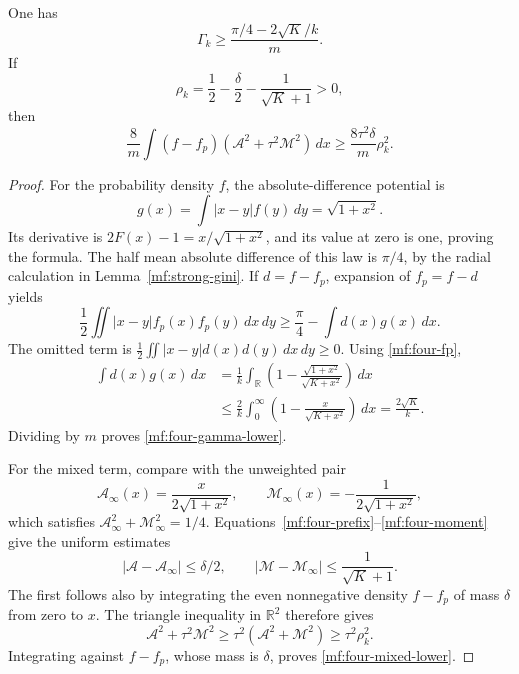 \begin{lemma}\label{mf:four-bounds}
One has
\begin{equation}\label{mf:four-gamma-lower}
 \Gamma_k\ge
 \frac{\pi/4-2\sqrt K/k}{m}.
\end{equation}
If
\[
 \rho_k=\frac12-\frac\delta2-\frac1{\sqrt K+1}>0,
\]
then
\begin{equation}\label{mf:four-mixed-lower}
 \frac8m\int(f-f_p)(\mathcal A^2+\tau^2\mathcal M^2)\,dx
 \ge\frac{8\tau^2\delta}{m}\rho_k^2.
\end{equation}
\end{lemma}
\begin{proof}
For the probability density \(f\), the absolute-difference potential is
\[
 g(x)=\int|x-y|f(y)\,dy=\sqrt{1+x^2}.
\]
Its derivative is \(2F(x)-1=x/\sqrt{1+x^2}\), and its value at zero
is one, proving the formula. The half mean absolute difference of this
law is \(\pi/4\), by the radial calculation in
Lemma~\ref{mf:strong-gini}.
If \(d=f-f_p\), expansion of \(f_p=f-d\) yields
\[
 \frac12\iint|x-y|f_p(x)f_p(y)\,dx\,dy
 \ge\frac\pi4-\int d(x)g(x)\,dx.
\]
The omitted term is
\(\tfrac12\iint|x-y|d(x)d(y)\,dx\,dy\ge0\).
Using \eqref{mf:four-fp},
\begin{align*}
 \int d(x)g(x)\,dx
 &=\frac1k\int_{\mathbb R}
       \left(1-\frac{\sqrt{1+x^2}}{\sqrt{K+x^2}}\right)\,dx\\
 &\le\frac2k\int_0^\infty
       \left(1-\frac{x}{\sqrt{K+x^2}}\right)\,dx
 =\frac{2\sqrt K}{k}.
\end{align*}
Dividing by \(m\) proves \eqref{mf:four-gamma-lower}.

For the mixed term, compare with the unweighted pair
\[
 \mathcal A_\infty(x)=\frac{x}{2\sqrt{1+x^2}},\qquad
 \mathcal M_\infty(x)=-\frac1{2\sqrt{1+x^2}},
\]
which satisfies \(\mathcal A_\infty^2+\mathcal M_\infty^2=1/4\).
Equations~\eqref{mf:four-prefix}--\eqref{mf:four-moment} give the
uniform estimates
\[
 |\mathcal A-\mathcal A_\infty|\le\delta/2,\qquad
 |\mathcal M-\mathcal M_\infty|\le\frac1{\sqrt K+1}.
\]
The first follows also by integrating the even nonnegative density
\(f-f_p\) of mass \(\delta\) from zero to \(x\).
The triangle inequality in \(\mathbb R^2\) therefore gives
\[
 \mathcal A^2+\tau^2\mathcal M^2
 \ge\tau^2(\mathcal A^2+\mathcal M^2)
 \ge\tau^2\rho_k^2.
\]
Integrating against \(f-f_p\), whose mass is \(\delta\), proves
\eqref{mf:four-mixed-lower}.
\end{proof}

